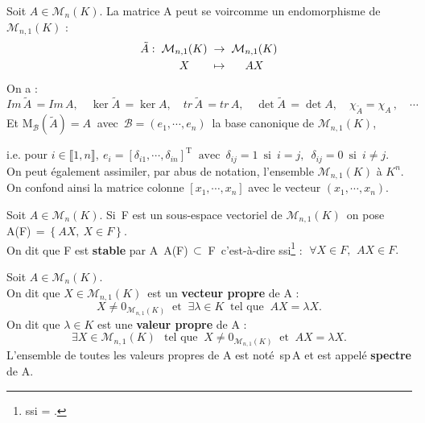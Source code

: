 Soit \(A\in \mathcal{M}_n(K)\).
La matrice A peut se \guillemetleft voir\guillemetright\;comme un endomorphisme de \(\mathcal{M}_{n,1}(K)\) :\vspace{-0.17cm}
\[\arraycolsep=0.1cm\begin{array}{rccc}
    \tilde{A}: & \mathcal{M}_{n,1}(K) & \to & \mathcal{M}_{n,1}(K)\vspace{0.1cm} \\
    & X & \mapsto & AX
\end{array}\]\vspace{-0.1cm}
On a : \(Im\, \tilde{A}\,=Im\, A,\quad \ker \tilde{A} \,=\ker A,\quad tr\,\tilde{A} \,=tr\,A,\quad \det \tilde{A} \,=\det A,\quad \chi_{\tilde{A}}=\chi_A\,,\quad \cdots\)\vspace{0.1cm}\\
Et M\(_\mathcal{B}(\tilde{A})=A\ \) avec \(\,\mathcal{B}=(e_1,\cdots, e_n)\,\) la base canonique de \(\mathcal{M}_{n,1}(K)\),\vspace{0.1cm}

\hspace{1cm}i.e. pour \(i\in \llbracket 1,n \rrbracket,\ e_i = [\delta_{i1},\cdots,\delta_{in}]^\text{T}\ \text{ avec }\, \delta _{ij}=1\,\text{ si }\,i=j,\ \; \delta_{ij}=0\,\text{ si }\,i\neq j.\)\vspace{0.4cm}\\
On peut également assimiler, par abus de notation, l'ensemble \(\mathcal{M}_{n,1}(K)\) à $K^n$. On confond ainsi la matrice colonne $[x_1,\cdots,x_n]$ avec le vecteur $(x_1,\cdots,x_n)$. 

\vspace{1.6cm}

Soit \(A\in \mathcal{M}_{n}(K)\). Si\, F est un sous-espace vectoriel de \(\mathcal{M}_{n,1}(K)\,\) on pose A(F)\(\,=\left\{AX,\ X\in F\right\}\).\vspace{0.1cm}\\ 
On dit que F est \textbf{stable} par A \ssi \,A(F)$\,\subset\;$F\, c'est-à-dire ssi\footnote{ssi = \ssi.} : \(\;\forall X\in F,\ \, AX\in F.\) 

\vspace{1.5cm}

Soit \(A\in \mathcal{M}_n(K)\).\vspace{0.1cm}\\
On dit que \(X\in \mathcal{M}_{n,1}(K)\,\) est un \textbf{vecteur propre} de A \ssi :\vspace{-0.2cm} \[X\neq 0_{\mathcal{M}_{n,1}(K)}\ \text{ et }\ \exists \lambda \in K \ \text{ tel que } \ AX=\lambda X.\]
On dit que \(\lambda \in K\) est une \textbf{valeur propre} de A \ssi :\vspace{-0.2cm} \[\exists X\in \mathcal{M}_{n,1}(K)\, \ \text{ tel que } \ X\neq 0_{\mathcal{M}_{n,1}(K)} \  \text{ et }\  AX=\lambda X.\]
L'ensemble de toutes les valeurs propres de A est noté\, sp\,A et est appelé \textbf{spectre} de A.

